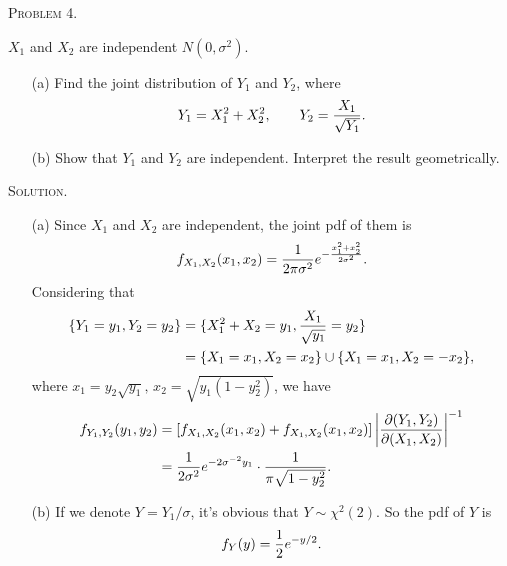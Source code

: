 \documentclass{article}
\begin{document}
\begin{CJK}{UTF8}{gbsn}
    \begin{shaded}
        \noindent\textsc{Problem 4.}\par
        $X_1$ and $X_2$ are independent $N(0, \sigma^2)$.
        \begin{itemize}
            \item [(a)] Find the joint distribution of $Y_1$ and $Y_2$, where
                  \begin{align}
                      Y_1 = X_1^2+X_2^2,\qquad Y_2=\frac{X_1}{\sqrt{Y_1}}.\notag
                  \end{align}
            \item [(b)] Show that $Y_1$ and $Y_2$ are independent. Interpret the result geometrically.
        \end{itemize}
    \end{shaded}
    \noindent\textsc{Solution.}\par
    \begin{itemize}
        \item [(a)]
              Since $X_1$ and $X_2$ are independent, the joint pdf of them is
              \begin{align}
                  f_{X_1,X_2}(x_1,x_2) = \frac{1}{2\pi \sigma^2}e^{-\frac{x_1^2 + x_2^2}{2\sigma^2}}.\notag
              \end{align}
              Considering that
              \begin{align}
                  \{ Y_1=y_1, Y_2 = y_2\} & = \{X_1^2 + X_2 = y_1,\frac{X_1}{\sqrt{y_1}}=y_2\}\notag   \\
                                          & = \{X_1=x_1, X_2=x_2 \} \cup \{X_1=x_1, X_2=-x_2 \},\notag
              \end{align}
              where $x_1 = y_2\sqrt{y_1},\, x_2=\sqrt{y_1(1-y_2^2)}$,
              we have
              \begin{align}
                  f_{Y_1,Y_2}(y_1,y_2) & =\left [ f_{X_1,X_2}(x_1,x_2) + f_{X_1,X_2}(x_1,x_2) \right ] \left | \frac{\partial (Y_1,Y_2)}{\partial (X_1, X_2)}  \right |^{-1}\notag \\
                                       & = \frac{1}{2\sigma^2}e^{-2\sigma^{-2} y_1}\cdot \frac{1}{\pi \sqrt{1-y_2^2}}.\notag
              \end{align}
        \item [(b)]
              If we denote $Y=Y_1/\sigma$, it's obvious that $Y \sim \chi^2(2)$. So the pdf of $Y$ is
              \begin{align}
                  f_{Y}(y) = \frac{1}{2}e^{-y/2}.\notag

\end{align}
\end{itemize}
\end{CJK}
\end{document}

